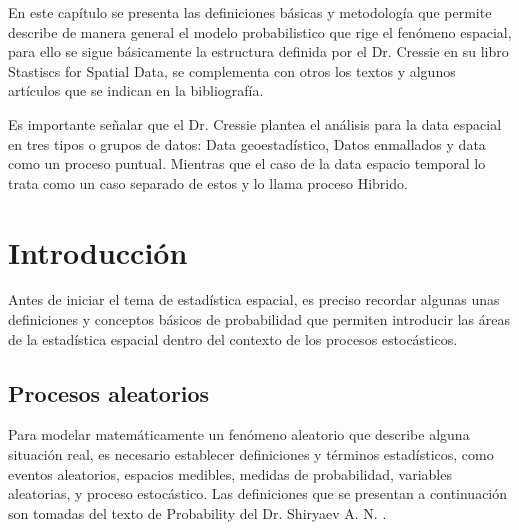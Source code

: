\documentclass[12pt]{report}
\begin{document}
	
	En este capítulo se presenta las definiciones básicas y metodología que permite describe de manera general el modelo probabilistico que rige el fenómeno espacial, para ello se sigue básicamente la estructura definida por el Dr. Cressie \cite{Cress} en su libro Stastiscs for Spatial Data, se complementa con otros los textos y algunos artículos que se indican en la bibliografía. 
	
	
	
	Es importante señalar que el Dr. Cressie plantea el análisis para la data espacial en tres tipos o grupos de datos: Data geoestadístico, Datos enmallados y data como un proceso puntual. Mientras que el caso de la data espacio temporal lo trata como un caso separado de estos y lo llama proceso Hibrido. 
	
	
	


	\section{Introducción}             %
	
	
	
	Antes de iniciar el tema de estadística espacial, es preciso  recordar algunas unas definiciones y conceptos básicos de probabilidad que permiten introducir las áreas de la estadística espacial dentro del contexto de los procesos estocásticos.\\
	
	
	
	
	
	\subsection{Procesos aleatorios}
	
   Para modelar  matemáticamente un fenómeno aleatorio que describe alguna situación real, es necesario establecer definiciones y términos estadísticos,  como eventos aleatorios, espacios medibles, medidas de probabilidad, variables aleatorias,  y proceso estocástico. Las  definiciones que se presentan a continuación son tomadas del texto de Probability  del Dr. Shiryaev A. N. \cite{Shir}.
   	
\end{document}
